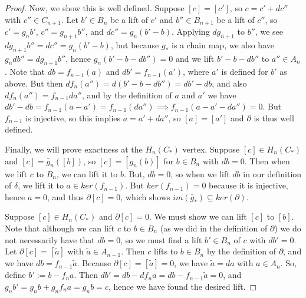 \documentclass[11pt, oneside]{amsart}   	%
\theoremstyle{definition}
\begin{document}
\begin{proof}
	Now, we show this is well defined. Suppose $[c] = [c']$, so $c = c' + dc''$ with $c''\in C_{n + 1}$. Let $b'\in B_n$ be 
	a lift of $c'$ and $b''\in B_{n + 1}$ be a lift of $c''$, so $c' = g_n b'$, $c'' = g_{n + 1}b''$, and $dc'' = g_n(b' - b)$. 
	Applying $dg_{n + 1}$ to $b''$, we see $dg_{n + 1}b'' = dc'' = g_n(b' - b)$, but because $g_*$ is a chain map, we also 
	have $g_n db'' = dg_{n + 1}b''$, hence $g_n(b' - b - db'') = 0$ and we lift $b' - b - db''$ to $a''\in A_n$. 
	Note that $db = f_{n - 1}(a)$ and $db' = f_{n - 1}(a')$, where $a'$ is defined for $b'$ as above. But then $df_{n}(a'') = 
	d(b' - b - db'') = db' - db$, and also $df_n(a'') = f_{n - 1} da''$, and by the definition of $a$ and $a'$ we have 
	$db' - db = f_{n - 1}(a - a') = f_{n - 1}(da'')\implies f_{n - 1}(a - a' - da'') = 0$. But $f_{n - 1}$ is injective, so this implies 
	$a = a' + da''$, so $[a] = [a']$ and $\partial$ is thus well defined. 
	
	Finally, we will prove exactness at the $H_n(C_*)$ vertex. Suppose $[c]\in H_n(C_*)$ and $[c] = \bar g_n([b])$, so 
	$[c] = [g_n(b)]$ for $b\in B_n$ with $db = 0$. Then when we lift $c$ to $B_n$, we can lift it to $b$. But, $db = 0$, 
	so when we lift $db$ in our definition of $\delta$, we lift it to $a\in ker(f_{n - 1})$. But $ker(f_{n - 1}) = 0$ because it 
	is injective, hence $a = 0$, and thus $\partial [c] = 0$, which shows $im(\bar g_*)\subseteq ker(\partial)$. 
	
	Suppose $[c]\in H_n(C_*)$ and $\partial[c] = 0$. We must show we can lift $[c]$ to $[b]$. Note that although we can 
	lift $c$ to $b\in B_n$ (as we did in the definition of $\partial$) we do not necessarily have that $db = 0$, so we must 
	find a lift $b'\in B_n$ of $c$ with $db' = 0$. Let $\partial[c] = [\tilde a]$ with $\tilde a\in A_{n - 1}$. Then $c$ lifts to $b\in 
	B_n$ by the definition of $\partial$, and we have $db = f_{n - 1}\tilde a$. Because $\partial[c] = [\tilde a] = 0$, we have 
	$\tilde a = da$ with $a\in A_n$. So, define $b' := b - f_n a$. Then $db' = db - d f_n a = db - f_{n - 1} \tilde a = 0$, and 
	$g_n b' = g_n b + g_n f_n a = g_n b = c$, hence we have found the desired lift. 
\end{proof}
\end{document}
